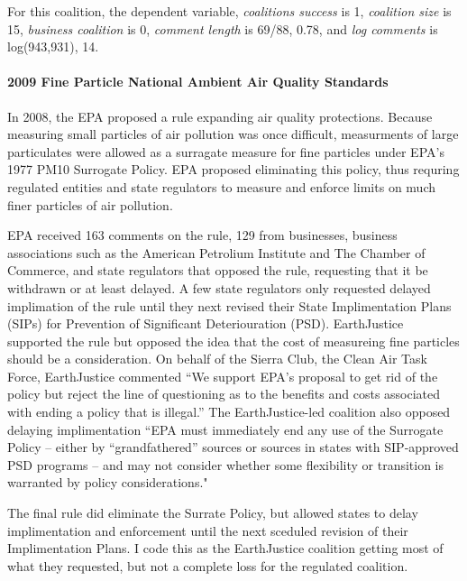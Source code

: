 \documentclass[
      12pt,
        ]{article}
\begin{document}
For this coalition, the dependent variable, \emph{coalitions success} is 1, \emph{coalition size} is 15, \emph{business coalition} is 0, \emph{comment length} is 69/88, 0.78, and \emph{log comments} is log(943,931), 14.

\hypertarget{fine-particle-national-ambient-air-quality-standards}{%
\paragraph{2009 Fine Particle National Ambient Air Quality Standards}\label{fine-particle-national-ambient-air-quality-standards}}

In 2008, the EPA proposed a rule expanding air quality protections. Because measuring small particles of air pollution was once difficult, measurments of large particulates were allowed as a surragate measure for fine particles under EPA's 1977 PM10 Surrogate Policy. EPA proposed eliminating this policy, thus requring regulated entities and state regulators to measure and enforce limits on much finer particles of air pollution.

EPA received 163 comments on the rule, 129 from businesses, business associations such as the American Petrolium Institute and The Chamber of Commerce, and state regulators that opposed the rule, requesting that it be withdrawn or at least delayed. A few state regulators only requested delayed implimation of the rule until they next revised their State Implimentation Plans (SIPs) for Prevention of Significant Deteriouration (PSD). EarthJustice supported the rule but opposed the idea that the cost of measureing fine particles should be a consideration. On behalf of the Sierra Club, the Clean Air Task Force, EarthJustice commented ``We support EPA's proposal to get rid of the policy but reject the line of questioning as to the benefits and costs associated with ending a policy that is illegal.'' The EarthJustice-led coalition also opposed delaying implimentation ``EPA must immediately end any use of the Surrogate Policy -- either by ``grandfathered'' sources or sources in states with SIP‐approved PSD programs -- and may not consider whether some flexibility or transition is warranted by policy considerations."

The final rule did eliminate the Surrate Policy, but allowed states to delay implimentation and enforcement until the next sceduled revision of their Implimentation Plans. I code this as the EarthJustice coalition getting most of what they requested, but not a complete loss for the regulated coalition.
\end{document}
